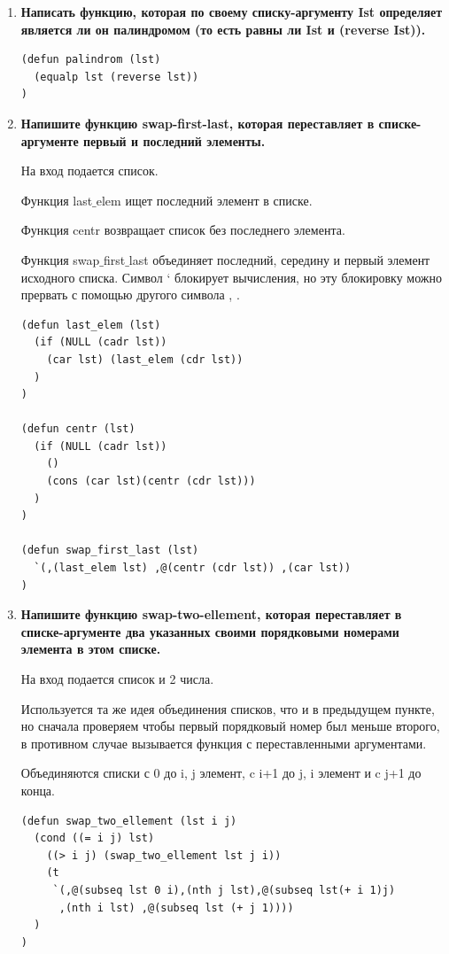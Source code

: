 \documentclass[a4paper,14pt]{extreport} %
\begin{document}
\begin{enumerate}
\item \textbf{Написать функцию, которая по своему списку-аргументу Ist определяет является ли он палиндромом (то есть равны ли Ist и (reverse Ist)).}

\begin{lstlisting}
(defun palindrom (lst)
  (equalp lst (reverse lst)) 
)
\end{lstlisting}

\item \textbf{Напишите функцию swap-first-last, которая переставляет в списке-аргументе первый и последний элементы.}

На вход подается список. 

Функция last$\_$elem ищет последний элемент в списке. 

Функция centr возвращает список без последнего элемента. 

Функция swap$\_$first$\_$last объединяет последний, середину и первый элемент исходного списка. 
Символ ` блокирует вычисления, но эту блокировку можно прервать с помощью другого символа , .

\begin{lstlisting}
(defun last_elem (lst)
  (if (NULL (cadr lst)) 
    (car lst) (last_elem (cdr lst))
  ) 
)

(defun centr (lst)
  (if (NULL (cadr lst)) 
    ()
    (cons (car lst)(centr (cdr lst)))
  )
)

(defun swap_first_last (lst)
  `(,(last_elem lst) ,@(centr (cdr lst)) ,(car lst)) 
)
\end{lstlisting}

\item \textbf{Напишите функцию swap-two-ellement, которая переставляет в списке-аргументе два указанных своими порядковыми номерами элемента в этом списке.}

На вход подается список и 2 числа. 

Используется та же идея объединения списков, что и в предыдущем пункте, но сначала проверяем чтобы первый порядковый номер был меньше второго, в противном случае вызывается функция с переставленными аргументами. 

Объединяются списки с 0 до i, j элемент, c i+1 до j, i элемент и c j+1 до конца. 

\begin{lstlisting}
(defun swap_two_ellement (lst i j)
  (cond ((= i j) lst)
    ((> i j) (swap_two_ellement lst j i))
    (t
     `(,@(subseq lst 0 i),(nth j lst),@(subseq lst(+ i 1)j)
      ,(nth i lst) ,@(subseq lst (+ j 1))))
  ) 
)
\end{lstlisting}


\end{enumerate}
\end{document}
